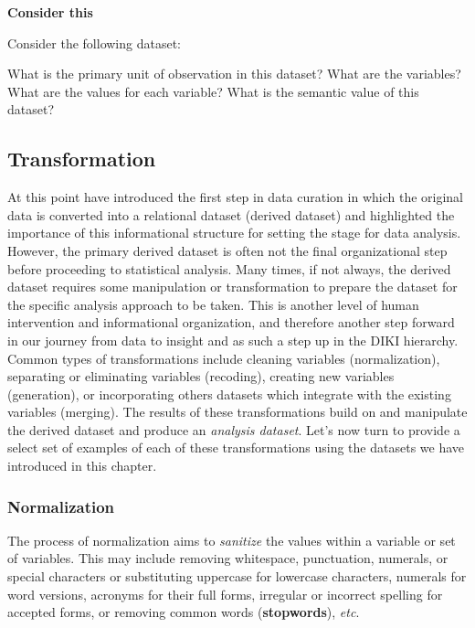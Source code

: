 \documentclass[
  letterpaper,
]{latex/krantz}
\begin{document}
\begin{tcolorbox}[enhanced jigsaw, left=2mm, arc=.35mm, colback=white, rightrule=.15mm, toprule=.15mm, breakable, leftrule=.75mm, opacityback=0, bottomrule=.15mm]

\textbf{ Consider this}

Consider the following dataset:

What is the primary unit of observation in this dataset? What are the
variables? What are the values for each variable? What is the semantic
value of this dataset?

\end{tcolorbox}

\hypertarget{transformation}{%
\subsection{Transformation}\label{transformation}}

At this point have introduced the first step in data curation in which
the original data is converted into a relational dataset (derived
dataset) and highlighted the importance of this informational structure
for setting the stage for data analysis. However, the primary derived
dataset is often not the final organizational step before proceeding to
statistical analysis. Many times, if not always, the derived dataset
requires some manipulation or transformation to prepare the dataset for
the specific analysis approach to be taken. This is another level of
human intervention and informational organization, and therefore another
step forward in our journey from data to insight and as such a step up
in the DIKI hierarchy. Common types of transformations include cleaning
variables (normalization), separating or eliminating variables
(recoding), creating new variables (generation), or incorporating others
datasets which integrate with the existing variables (merging). The
results of these transformations build on and manipulate the derived
dataset and produce an \emph{analysis dataset}. Let's now turn to
provide a select set of examples of each of these transformations using
the datasets we have introduced in this chapter.

\hypertarget{normalization}{%
\subsubsection{Normalization}\label{normalization}}

The process of normalization aims to \emph{sanitize} the values within a
variable or set of variables. This may include removing whitespace,
punctuation, numerals, or special characters or substituting uppercase
for lowercase characters, numerals for word versions, acronyms for their
full forms, irregular or incorrect spelling for accepted forms, or
removing common words (\textbf{stopwords}), \emph{etc}.
\end{document}
